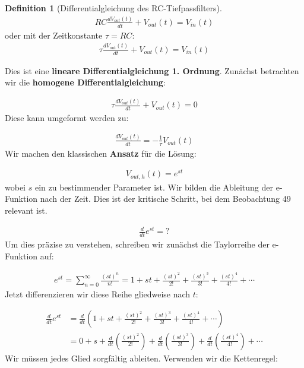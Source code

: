 \documentclass[a4paper,12pt,twoside]{report}
\theoremstyle{definition}
\newtheorem{definition}{Definition}
\begin{document}
\begin{definition}[Differentialgleichung des RC-Tiefpassfilters]
	\begin{align}
		RC \frac{dV_{out}(t)}{dt} + V_{out}(t) = V_{in}(t)
	\end{align}
	oder mit der Zeitkonstante $\tau = RC$:
	\begin{align}
		\tau \frac{dV_{out}(t)}{dt} + V_{out}(t) = V_{in}(t)
	\end{align}
\end{definition}
Dies ist eine \textbf{lineare Differentialgleichung 1. Ordnung}. Zunächst betrachten wir die \textbf{homogene Differentialgleichung}:

\begin{align}
	\tau \frac{dV_{out}(t)}{dt} + V_{out}(t) = 0
\end{align}
Diese kann umgeformt werden zu:

\begin{align}
	\frac{dV_{out}(t)}{dt} = -\frac{1}{\tau} V_{out}(t)
\end{align}
Wir machen den klassischen \textbf{Ansatz} für die Lösung:

\begin{align}
	V_{out,h}(t) = e^{st}
\end{align}
wobei $s$ ein zu bestimmender Parameter ist. Wir bilden die Ableitung der e-Funktion nach der Zeit. Dies ist der kritische Schritt, bei dem Beobachtung 49 relevant ist.

\begin{align}
	\frac{d}{dt} e^{st} = ?
\end{align}
Um dies präzise zu verstehen, schreiben wir zunächst die Taylorreihe der e-Funktion auf:

\begin{align}
	e^{st} = \sum_{n=0}^{\infty} \frac{(st)^n}{n!} = 1 + st + \frac{(st)^2}{2!} + \frac{(st)^3}{3!} + \frac{(st)^4}{4!} + \cdots
\end{align}
Jetzt differenzieren wir diese Reihe gliedweise nach $t$:

\begin{align}
	\frac{d}{dt} e^{st} &= \frac{d}{dt} \left( 1 + st + \frac{(st)^2}{2!} + \frac{(st)^3}{3!} + \frac{(st)^4}{4!} + \cdots \right)\\
	&= 0 + s + \frac{d}{dt}\left(\frac{(st)^2}{2!}\right) + \frac{d}{dt}\left(\frac{(st)^3}{3!}\right) + \frac{d}{dt}\left(\frac{(st)^4}{4!}\right) + \cdots
\end{align}
Wir müssen jedes Glied sorgfältig ableiten. Verwenden wir die Kettenregel:
\end{document}
